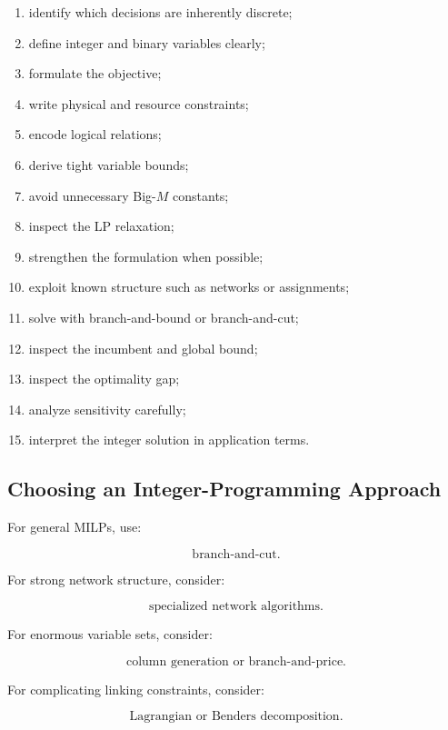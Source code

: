 \begin{enumerate}
    \item identify which decisions are inherently discrete;
    \item define integer and binary variables clearly;
    \item formulate the objective;
    \item write physical and resource constraints;
    \item encode logical relations;
    \item derive tight variable bounds;
    \item avoid unnecessary Big-\(M\) constants;
    \item inspect the LP relaxation;
    \item strengthen the formulation when possible;
    \item exploit known structure such as networks or assignments;
    \item solve with branch-and-bound or branch-and-cut;
    \item inspect the incumbent and global bound;
    \item inspect the optimality gap;
    \item analyze sensitivity carefully;
    \item interpret the integer solution in application terms.
\end{enumerate}

\subsection{Choosing an Integer-Programming Approach}
\label{subsec:choosing-integer-programming-method}

For general MILPs, use:

\[
\boxed{
\text{branch-and-cut}.
}
\]

For strong network structure, consider:

\[
\boxed{
\text{specialized network algorithms}.
}
\]

For enormous variable sets, consider:

\[
\boxed{
\text{column generation or branch-and-price}.
}
\]

For complicating linking constraints, consider:

\[
\boxed{
\text{Lagrangian or Benders decomposition}.
}
\]

